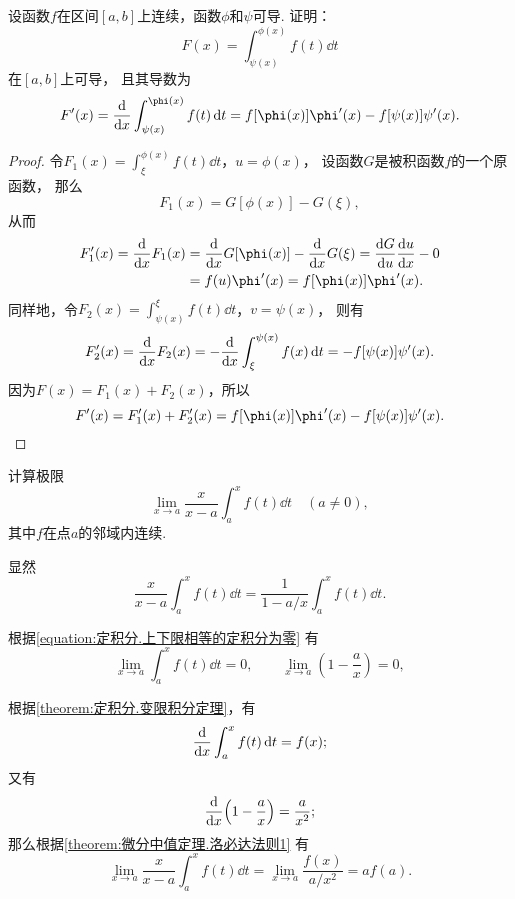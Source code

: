 \begin{example}
设函数\(f\)在区间\([a,b]\)上连续，函数\(\phi\)和\(\psi\)可导.
证明：\[
	F(x) = \int_{\psi(x)}^{\phi(x)} f(t) \dd{t}
\]在\([a,b]\)上可导，
且其导数为\begin{equation}\label{equation:定积分.含参变量积分的导数1}
	F'(x) = \dv{x} \int_{\psi(x)}^{\phi(x)} f(t) \dd{t}
	= f[\phi(x)] \phi'(x) - f[\psi(x)] \psi'(x).
\end{equation}
\begin{proof}
令\(F_1(x) = \int_{\xi}^{\phi(x)} f(t) \dd{t}\)，\(u = \phi(x)\)，
设函数\(G\)是被积函数\(f\)的一个原函数，
那么\[
	F_1(x) = G[\phi(x)] - G(\xi),
\]
从而\begin{align*}
	F'_1(x) = \dv{x} F_1(x)
	&= \dv{x} G[\phi(x)] - \dv{x} G(\xi) = \dv{G}{u} \dv{u}{x} - 0 \\
	&= f(u) \phi'(x) = f[\phi(x)] \phi'(x).
\end{align*}
同样地，令\(F_2(x) = \int_{\psi(x)}^{\xi} f(t) \dd{t}\)，\(v = \psi(x)\)，
则有\[
	F'_2(x) = \dv{x} F_2(x) = -\dv{x} \int_{\xi}^{\psi(x)} f(x) \dd{t}
	= -f[\psi(x)] \psi'(x).
\]
因为\(F(x) = F_1(x) + F_2(x)\)，所以\[
	F'(x) = F'_1(x) + F'_2(x)
	= f[\phi(x)] \phi'(x) - f[\psi(x)] \psi'(x).
	\qedhere
\]
\end{proof}
\end{example}

\begin{example}
计算极限\[
	\lim_{x \to a} \frac{x}{x-a} \int_a^x f(t) \dd{t}
	\quad(a\neq0),
\]
其中\(f\)在点\(a\)的邻域内连续.
\begin{solution}
显然\[
	\frac{x}{x-a} \int_a^x f(t) \dd{t}
	= \frac1{1 - a/x} \int_a^x f(t) \dd{t}.
\]

根据\cref{equation:定积分.上下限相等的定积分为零} 有\[
	\lim_{x \to a} \int_a^x f(t) \dd{t} = 0, \qquad
	\lim_{x \to a} \left( 1 - \frac{a}{x} \right) = 0,
\]

根据\cref{theorem:定积分.变限积分定理}，有\[
	\dv{x} \int_a^x f(t) \dd{t} = f(x);
\]
又有\[
	\dv{x}(1 - \frac{a}{x}) = \frac{a}{x^2};
\]
那么根据\cref{theorem:微分中值定理.洛必达法则1} 有\[
	\lim_{x \to a} \frac{x}{x-a} \int_a^x f(t) \dd{t}
	= \lim_{x \to a} \frac{f(x)}{a/x^2}
	= a f(a).
\]
\end{solution}
\end{example}

